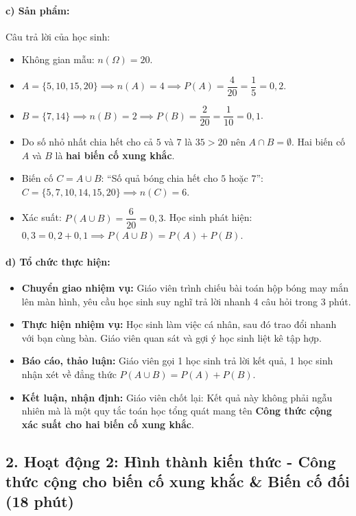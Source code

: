\documentclass[12pt, a4paper]{article}
\begin{document}
\paragraph{c) Sản phẩm:} Câu trả lời của học sinh:
\begin{itemize}[leftmargin=0.8cm]
    \item Không gian mẫu: $n(\Omega) = 20$.
    \item $A = \{5, 10, 15, 20\} \implies n(A) = 4 \implies P(A) = \dfrac{4}{20} = \dfrac{1}{5} = 0{,}2$.
    \item $B = \{7, 14\} \implies n(B) = 2 \implies P(B) = \dfrac{2}{20} = \dfrac{1}{10} = 0{,}1$.
    \item Do số nhỏ nhất chia hết cho cả $5$ và $7$ là $35 > 20$ nên $A \cap B = \emptyset$. Hai biến cố $A$ và $B$ là \textbf{hai biến cố xung khắc}.
    \item Biến cố $C = A \cup B$: ``Số quả bóng chia hết cho $5$ hoặc $7$'': $C = \{5, 7, 10, 14, 15, 20\} \implies n(C) = 6$.
    \item Xác suất: $P(A \cup B) = \dfrac{6}{20} = 0{,}3$. Học sinh phát hiện: $0{,}3 = 0{,}2 + 0{,}1 \implies P(A \cup B) = P(A) + P(B)$.
\end{itemize}

\paragraph{d) Tổ chức thực hiện:}
\begin{itemize}[leftmargin=0.8cm]
    \item \textbf{Chuyển giao nhiệm vụ:} Giáo viên trình chiếu bài toán hộp bóng may mắn lên màn hình, yêu cầu học sinh suy nghĩ trả lời nhanh 4 câu hỏi trong 3 phút.
    \item \textbf{Thực hiện nhiệm vụ:} Học sinh làm việc cá nhân, sau đó trao đổi nhanh với bạn cùng bàn. Giáo viên quan sát và gợi ý học sinh liệt kê tập hợp.
    \item \textbf{Báo cáo, thảo luận:} Giáo viên gọi 1 học sinh trả lời kết quả, 1 học sinh nhận xét về đẳng thức $P(A \cup B) = P(A) + P(B)$.
    \item \textbf{Kết luận, nhận định:} Giáo viên chốt lại: Kết quả này không phải ngẫu nhiên mà là một quy tắc toán học tổng quát mang tên \textbf{Công thức cộng xác suất cho hai biến cố xung khắc}.
\end{itemize}

\subsection*{2. Hoạt động 2: Hình thành kiến thức - Công thức cộng cho biến cố xung khắc \& Biến cố đối (18 phút)}
\end{document}
